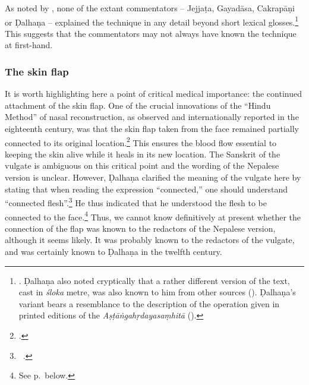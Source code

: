 As noted by \citeauthor{meul-hist}, none of the extant commentators -- Jejjaṭa,
Gayadāsa, Cakrapāṇi or Ḍalhaṇa -- explained the technique in any detail beyond
short lexical glosses.\footnote{\cite[IB, 328]{meul-hist}. Ḍalhaṇa also noted
    cryptically that a rather different version of the text, cast in \emph{śloka}
    metre, was also known to him from other sources (). Ḍalhaṇa's
    variant bears a resemblance to the description of the operation given in printed
    editions of the \emph{Aṣṭāṅgahṛdayasaṃhitā} ().} %
    This suggests that the commentators may not always have known the technique at
    first-hand. %

\subsubsection{The skin flap} 
\label{skinflap}
It is worth highlighting here a point of critical
medical importance: the continued attachment of the skin flap. One of the crucial
innovations of the “Hindu Method” of nasal reconstruction, as observed  and
internationally reported in the eighteenth century, was that the skin flap taken
from the face remained partially connected to its original
location.\footcite[See][67--70]{wuja-2003} This ensures the blood flow essential
to keeping the skin alive while it heals in its new location.  The Sanskrit of the
vulgate is ambiguous on this critical point and the wording of the Nepalese
version is unclear. However, Ḍalhaṇa clarified the meaning of the vulgate here by
stating that when reading the expression “connected,” one should understand
“connected flesh”.\footnote{\SS\ .}  He thus indicated that he
    understood the flesh to be connected to the face.\footnote{See
        p.\,\pageref{well-joined} below.}  Thus, we cannot know definitively at present
        whether the connection of the flap was known to the redactors of the Nepalese
        version, although it seems likely.  It was probably known to the redactors of the
        vulgate, and was certainly known to Ḍalhaṇa in the twelfth century.
        
